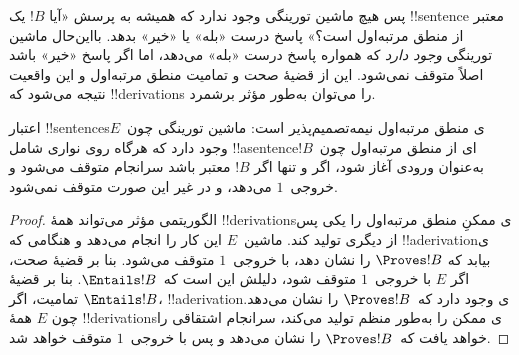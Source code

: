 \documentclass[../../../include/open-logic-section]{subfiles}
\begin{document}
\begin{explain}
پس هیچ ماشین تورینگی وجود ندارد که همیشه به پرسش «آیا $!B$ یک
!!{sentence}ٔ معتبر از منطق مرتبه‌اول است؟» پاسخ درست «بله» یا «خیر»
بدهد. بااین‌حال ماشین تورینگی \emph{وجود دارد} که همواره پاسخ درست
«بله» می‌دهد، اما اگر پاسخ «خیر» باشد اصلاً متوقف نمی‌شود. این از
قضیهٔ صحت و تمامیت منطق مرتبه‌اول و این واقعیت نتیجه می‌شود که
!!{derivation}s را می‌توان به‌طور مؤثر برشمرد.
\end{explain}

\begin{thm}
  اعتبار !!{sentence}sی منطق مرتبه‌اول نیمه‌تصمیم‌پذیر است: ماشین
  تورینگی چون~$E$ وجود دارد که هرگاه روی نواری شامل !!a{sentence}ای از
  منطق مرتبه‌اول چون~$!B$ به‌عنوان ورودی آغاز شود، اگر و تنها اگر
  $!B$ معتبر باشد سرانجام متوقف می‌شود و خروجی~$1$ می‌دهد، و در غیر
  این صورت متوقف نمی‌شود.
\end{thm}

\begin{proof}
  الگوریتمی مؤثر می‌تواند همهٔ !!{derivation}sی ممکنِ منطق مرتبه‌اول را
  یکی پس از دیگری تولید کند. ماشین~$E$ این کار را انجام می‌دهد و
  هنگامی که !!a{derivation}ی بیابد که $\Proves !B$ را نشان دهد، با
  خروجی~$1$ متوقف می‌شود. بنا بر قضیهٔ صحت، اگر $E$ با خروجی~$1$
  متوقف شود، دلیلش این است که~$\Entails !B$. بنا بر قضیهٔ تمامیت، اگر
  $\Entails !B$، !!a{derivation}ی وجود دارد که~$\Proves !B$ را نشان می‌دهد.
  چون $E$ همهٔ !!{derivation}sی ممکن را به‌طور منظم تولید می‌کند،
  سرانجام اشتقاقی را خواهد یافت که~$\Proves !B$ را نشان می‌دهد و پس
  با خروجی~$1$ متوقف خواهد شد.
\end{proof}
\end{document}
